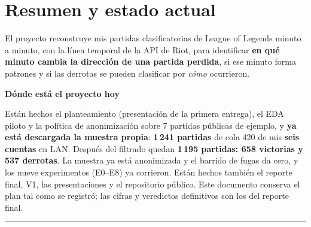 \documentclass[11pt,letterpaper]{article}
\newenvironment{respuesta}[1]
  {\par\medskip\setlength{\fboxsep}{10pt}%
   \begin{lrbox}{\cajaresp}%
   \begin{minipage}{\dimexpr\linewidth-2\fboxsep-3pt\relax}%
   \color{tinta}\textcolor{azul}{\textbf{#1}}\par\smallskip\ignorespaces}
  {\end{minipage}%
   \end{lrbox}%
   \noindent\textcolor{azul}{\rule[-\dp\cajaresp]{3pt}{\dimexpr\ht\cajaresp+\dp\cajaresp\relax}}%
   \colorbox{papel}{\usebox{\cajaresp}}\par\medskip}
\newcommand{\dato}[1]{\textbf{\textcolor{azul}{#1}}}
\begin{document}
\tableofcontents
\newpage

\section{Resumen y estado actual}

El proyecto reconstruye mis partidas clasificatorias de League of Legends minuto a
minuto, con la línea temporal de la API de Riot, para identificar \textbf{en qué
minuto cambia la dirección de una partida perdida}, si ese minuto forma patrones y si
las derrotas se pueden clasificar por \emph{cómo} ocurrieron.

\begin{respuesta}{Dónde está el proyecto hoy}
Están hechos el planteamiento (presentación de la primera entrega), el EDA piloto y la
política de anonimización sobre 7 partidas públicas de ejemplo, y \textbf{ya está
descargada la muestra propia}: \dato{1\,241 partidas} de cola 420 de mis \dato{seis
cuentas} en LAN. Después del filtrado quedan \dato{1\,195 partidas: 658 victorias y
537 derrotas}. La muestra ya está anonimizada y el barrido de fugas da cero, y los
nueve experimentos (E0--E8) ya corrieron. Están hechos también el reporte final, V1, las
presentaciones y el repositorio público. Este documento conserva el plan tal como se
registró; las cifras y veredictos definitivos son los del reporte final.
\end{respuesta}
\end{document}
